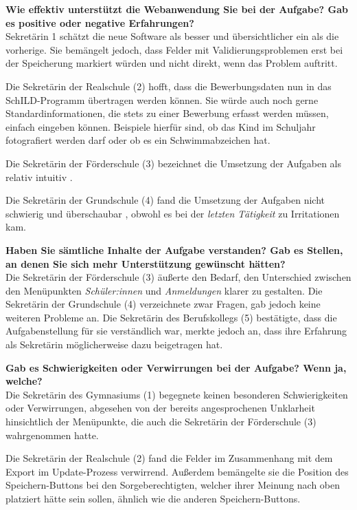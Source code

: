 \textbf{Wie effektiv unterstützt die Webanwendung Sie bei der Aufgabe?  Gab es positive oder negative Erfahrungen?}\\
Sekretärin 1 schätzt die neue Software als besser und übersichtlicher ein als die vorherige. Sie bemängelt jedoch, dass Felder mit Validierungsproblemen erst bei der Speicherung markiert würden und nicht direkt, wenn das Problem auftritt.

Die Sekretärin der Realschule (2) hofft, dass die Bewerbungsdaten nun in das SchILD-Programm übertragen werden können. Sie würde auch noch gerne \glqq Standardinformationen\grqq{}, die stets zu einer Bewerbung erfasst werden müssen, einfach eingeben können. Beispiele hierfür sind, ob das Kind im Schuljahr fotografiert werden darf oder ob es ein Schwimmabzeichen hat. 

Die Sekretärin der Förderschule (3) bezeichnet die Umsetzung der Aufgaben als \glqq relativ intuitiv\grqq{} .

Die Sekretärin der Grundschule (4) fand die Umsetzung der Aufgaben \glqq nicht schwierig\grqq{}  und \glqq überschaubar\grqq{} , obwohl es bei der \textit{letzten Tätigkeit} zu Irritationen kam.

\textbf{Haben Sie sämtliche Inhalte der Aufgabe verstanden? Gab es Stellen, an denen Sie sich mehr Unterstützung gewünscht hätten?}\\
Die Sekretärin der Förderschule (3) äußerte den Bedarf, den Unterschied zwischen den Menüpunkten \textit{Schüler:innen} und \textit{Anmeldungen} klarer zu gestalten. Die Sekretärin der Grundschule (4) verzeichnete zwar Fragen, gab jedoch keine weiteren Probleme an. Die Sekretärin des Berufskollegs (5) bestätigte, dass die Aufgabenstellung für sie verständlich war, merkte jedoch an, dass ihre Erfahrung als Sekretärin möglicherweise dazu beigetragen hat.

\textbf{Gab es Schwierigkeiten oder Verwirrungen bei der Aufgabe? Wenn ja, welche?}\\
Die Sekretärin des Gymnasiums (1) begegnete keinen besonderen Schwierigkeiten oder Verwirrungen, abgesehen von der bereits angesprochenen Unklarheit hinsichtlich der Menüpunkte, die auch die Sekretärin der Förderschule (3) wahrgenommen hatte.

Die Sekretärin der Realschule (2) fand die Felder im Zusammenhang mit dem Export im Update-Prozess verwirrend. Außerdem bemängelte sie die Position des Speichern-Buttons bei den Sorgeberechtigten, welcher ihrer Meinung nach oben platziert hätte sein sollen, ähnlich wie die anderen Speichern-Buttons.

